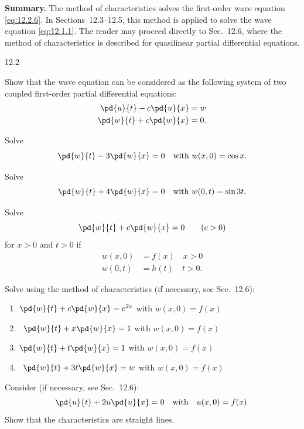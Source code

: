 \textbf{Summary.}  The method of characteristics solves the first-order wave equation \eqref{eq:12.2.6}.  In Sections~12.3--12.5, this method is applied to solve the wave equation \eqref{eq:12.1.1}.  The reader may proceed directly to Sec.~12.6, where the method of characteristics is described for quasilinear partial differential equations.

\begin{exercises}{12.2}

\item \label{ex:12.2.1}
Show that the wave equation can be considered as the following system of two coupled first-order partial differential equations:
\begin{align*}
\pd{u}{t} - c\pd{u}{x} &= w \\
\pd{w}{t} + c\pd{w}{x} &= 0.
\end{align*}

\item\starred \label{ex:12.2.2}
Solve
\[
\pd{w}{t} - 3\pd{w}{x} = 0 \quad \text{with } w(x,0) = \cos x.
\]

\item \label{ex:12.2.3}
Solve
\[
\pd{w}{t} + 4\pd{w}{x} = 0 \quad \text{with } w(0,t) = \sin 3t.
\]

\item \label{ex:12.2.4}
Solve
\[
\pd{w}{t} + c\pd{w}{x} = 0 \qquad (c > 0)
\]
for $x > 0$ and $t > 0$ if
\begin{align*}
w(x,0) &= f(x) \quad x > 0 \\
w(0,t) &= h(t) \quad t > 0.
\end{align*}

\item \label{ex:12.2.5}
Solve using the method of characteristics (if necessary, see Sec.~12.6):
\begin{enumerate}
\item[(a)] $\displaystyle \pd{w}{t} + c\pd{w}{x} = e^{2x}$ with $w(x,0) = f(x)$

\item[(b)]\starred\ $\displaystyle \pd{w}{t} + x\pd{w}{x} = 1$ with $w(x,0) = f(x)$

\item[(c)] $\displaystyle \pd{w}{t} + t\pd{w}{x} = 1$ with $w(x,0) = f(x)$

\item[(d)]\starred\ $\displaystyle \pd{w}{t} + 3t\pd{w}{x} = w$ with $w(x,0) = f(x)$
\end{enumerate}

\item\starred \label{ex:12.2.6}
Consider (if necessary, see Sec.~12.6):
\[
\pd{u}{t} + 2u\pd{u}{x} = 0 \quad \text{with} \quad u(x,0) = f(x).
\]
Show that the characteristics are straight lines.


\end{exercises}
